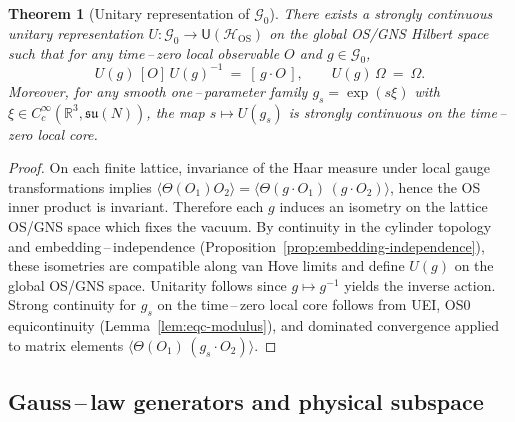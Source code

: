 \documentclass[11pt]{amsart}
\theoremstyle{plain}
\newtheorem{theorem}{Theorem}[section]
\theoremstyle{definition}
\theoremstyle{remark}
\begin{document}
\begin{theorem}[Unitary representation of $\mathcal G_0$]\label{thm:unitary-gauge}
There exists a strongly continuous unitary representation $U: \mathcal G_0\to \mathsf U(\mathcal H_{\mathrm{OS}})$ on the global OS/GNS Hilbert space such that for any time\,–\,zero local observable $O$ and $g\in\mathcal G_0$,
\[
  U(g)\,[O]\,U(g)^{-1}\ =\ [\,g\cdot O\,],\qquad U(g)\,\Omega\ =\ \Omega.
\]
Moreover, for any smooth one\,–\,parameter family $g_s=\exp(s\xi)$ with $\xi\in C_c^\infty(\mathbb R^3,\mathfrak{su}(N))$, the map $s\mapsto U(g_s)$ is strongly continuous on the time\,–\,zero local core.
\end{theorem}
\begin{proof}
On each finite lattice, invariance of the Haar measure under local gauge transformations implies $\langle \Theta(O_1) O_2\rangle=\langle \Theta(g\cdot O_1)\, (g\cdot O_2)\rangle$, hence the OS inner product is invariant. Therefore each $g$ induces an isometry on the lattice OS/GNS space which fixes the vacuum. By continuity in the cylinder topology and embedding\,–\,independence (Proposition~\ref{prop:embedding-independence}), these isometries are compatible along van Hove limits and define $U(g)$ on the global OS/GNS space. Unitarity follows since $g\mapsto g^{-1}$ yields the inverse action. Strong continuity for $g_s$ on the time\,–\,zero local core follows from UEI, OS0 equicontinuity (Lemma~\ref{lem:eqc-modulus}), and dominated convergence applied to matrix elements $\langle \Theta(O_1)\, (g_s\cdot O_2)\rangle$.
\end{proof}

\subsection{Gauss\,–\,law generators and physical subspace}
\end{document}
